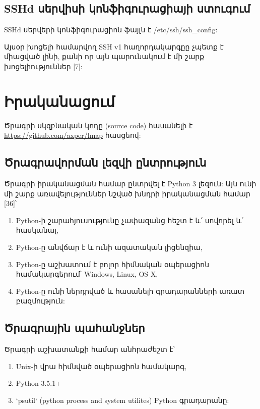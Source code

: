 \documentclass[a4paper,12pt]{article}
\begin{document}
\begin{sloppypar}


\subsection{SSHd սերվիսի կոնֆիգուրացիայի ստուգում}


SSHd սերվերի կոնֆիգուրացիոն ֆայլն է /etc/ssh/ssh\_config:

Այսօր խոցելի համարվող SSH v1 հաղորդակարգըը չպետք է միացված լինի, քանի
որ այն պարունակում է մի շարք խոցելիություններ [7]:


\section{Իրականացում}


Ծրագրի սկզբնական կոդը (source code) հասանելի է \url{https://github.com/axper/lmap} հասցեով:


\subsection{Ծրագրավորման լեզվի ընտրություն}


Ծրագրի իրականացման համար ընտրվել է Python 3 լեզուն:
Այն ունի մի շարք առավելություններ նշված խնդրի իրականացման համար [36]՝

\begin{enumerate}
\item Python-ի շարահյուսությունը չափազանց հեշտ է և՛ սովորել և՛ հասկանալ,
\item Python-ը անվճար է և ունի ազատական լիցենզիա,
\item Python-ը աշխատում է բոլոր հիմնական օպերացիոն համակարգերում՝ Windows, Linux, OS X,
\item Python-ը ունի ներդրված և հասանելի գրադարանների առատ բազմություն:
\end{enumerate}


\subsection{Ծրագրային պահանջներ}

Ծրագրի աշխատանքի համար անհրաժեշտ է՝

\begin{enumerate}
\item Unix-ի վրա հիմնված օպերացիոն համակարգ,
\item Python 3.5.1+
\item `psutil` (python process and system utilites) Python գրադարանը:
\end{enumerate}


\end{sloppypar}
\end{document}
